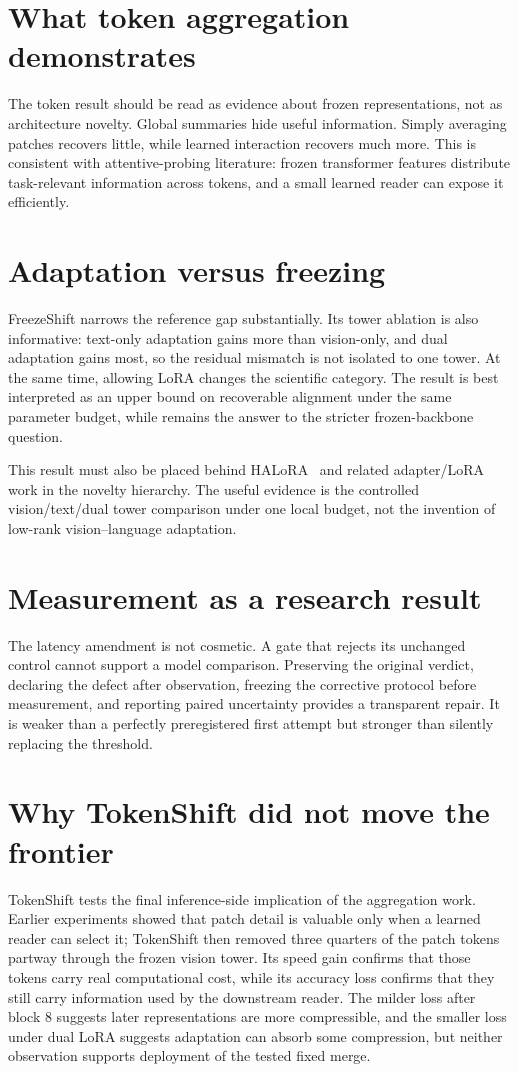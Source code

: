 \section{What token aggregation demonstrates}
The token result should be read as evidence about frozen representations, not as architecture novelty. Global summaries hide useful information. Simply averaging patches recovers little, while learned interaction recovers much more. This is consistent with attentive-probing literature: frozen transformer features distribute task-relevant information across tokens, and a small learned reader can expose it efficiently.

\section{Adaptation versus freezing}
FreezeShift narrows the reference gap substantially. Its tower ablation is also informative: text-only adaptation gains more than vision-only, and dual adaptation gains most, so the residual mismatch is not isolated to one tower. At the same time, allowing LoRA changes the scientific category. The result is best interpreted as an upper bound on recoverable alignment under the same parameter budget, while \MTone{} remains the answer to the stricter frozen-backbone question.

This result must also be placed behind HALoRA~\cite{zhang2026halora} and related adapter/LoRA work in the novelty hierarchy. The useful evidence is the controlled vision/text/dual tower comparison under one local budget, not the invention of low-rank vision--language adaptation.

\section{Measurement as a research result}
The latency amendment is not cosmetic. A gate that rejects its unchanged control cannot support a model comparison. Preserving the original verdict, declaring the defect after observation, freezing the corrective protocol before measurement, and reporting paired uncertainty provides a transparent repair. It is weaker than a perfectly preregistered first attempt but stronger than silently replacing the threshold.

\section{Why TokenShift did not move the frontier}
TokenShift tests the final inference-side implication of the aggregation work. Earlier experiments showed that patch detail is valuable only when a learned reader can select it; TokenShift then removed three quarters of the patch tokens partway through the frozen vision tower. Its speed gain confirms that those tokens carry real computational cost, while its accuracy loss confirms that they still carry information used by the downstream reader. The milder loss after block 8 suggests later representations are more compressible, and the smaller loss under dual LoRA suggests adaptation can absorb some compression, but neither observation supports deployment of the tested fixed merge.

